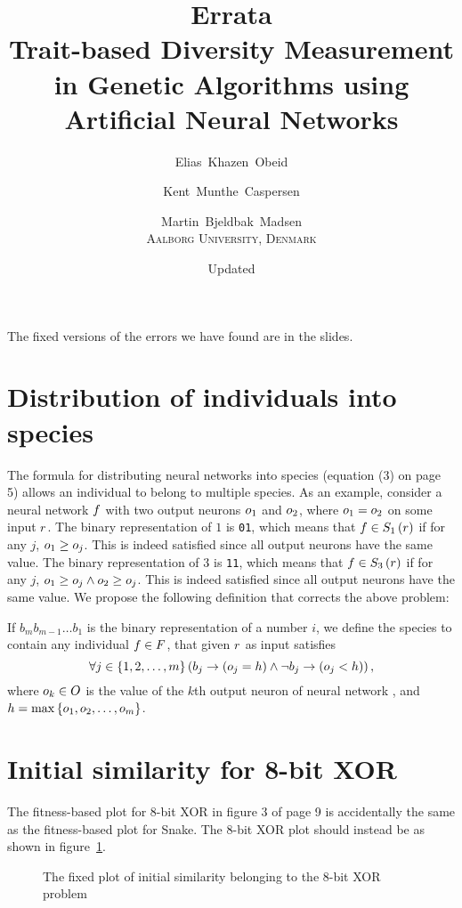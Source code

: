 \documentclass{memoir}
\title{Errata\\
\Large Trait-based Diversity Measurement in Genetic Algorithms using Artificial Neural Networks}
\author{Elias~Khazen~Obeid \and
        Kent~Munthe~Caspersen \and
      Martin~Bjeldbak~Madsen\\
    \scshape Aalborg University, Denmark}
\date{Updated \formatdate{20}{6}{2014}}
\begin{document}
\pagestyle{empty}
\maketitle
\thispagestyle{empty}


The fixed versions of the errors we have found are in the slides.

\section*{Distribution of individuals into species}
The formula for distributing neural networks into species (equation (3) on page 5) allows an individual to belong to multiple species.
As an example, consider a neural network $f$ with two output neurons $o_1$ and $o_2$, where $o_1 = o_2$ on some input $r$.
The binary representation of $1$ is \texttt{01}, which means that $f \in S_{1}\left(r\right)$ if for any $j$, $o_1 \geq o_j$. This is indeed satisfied since all output neurons have the same value.
The binary representation of $3$ is \texttt{11}, which means that $f \in S_{3}\left(r\right)$ if for any $j$, $o_1 \geq o_j \wedge o_2 \geq o_j$. This is indeed satisfied since all output neurons have the same value. We propose the following definition that corrects the above problem:

If $b_{m}b_{m-1}\dots b_1$ is the binary representation of a number $i$, we define the species  to contain any individual $f \in F$, that given $r$ as input satisfies
\begin{equation*}
  \forall j \in \left\{1, 2,\dots,m\right\}\left(b_j \rightarrow \left(o_j = h\right) \land \neg b_j \rightarrow \left(o_j < h\right)\right),
\end{equation*}
where $o_k \in O$ is the value of the $k$th output neuron of neural network \ind, and $h = \max\left\{o_1, o_2, \dots, o_m\right\}$.

\section*{Initial similarity for 8-bit XOR}
The fitness-based plot for 8-bit XOR in figure 3 of page 9 is accidentally the same as the fitness-based plot for Snake. 
The 8-bit XOR plot should instead be as shown in figure~\ref{fig:initial-similarity-xor}.

\begin{figure}[htbp]
  \centering
  \resizebox{0.5\linewidth}{!}{%
  
}
  \caption{The fixed plot of initial similarity belonging to the 8-bit XOR problem}\label{fig:initial-similarity-xor}
\end{figure}
\end{document}
